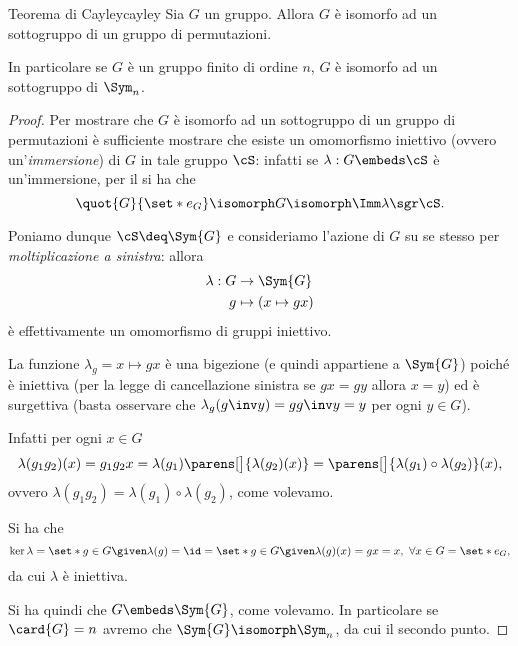 \begin{theorem}
    {Teorema di Cayley}{cayley}
    Sia $G$ un gruppo. Allora $G$ è isomorfo ad un sottogruppo di un gruppo di permutazioni.

    In particolare se $G$ è un gruppo finito di ordine $n$, $G$ è isomorfo ad un sottogruppo di $\Sym_n$. 
\end{theorem}
\begin{proof}
    Per mostrare che $G$ è isomorfo ad un sottogruppo di un gruppo di permutazioni è sufficiente mostrare che esiste un omomorfismo iniettivo (ovvero un'\emph{immersione}) di $G$ in tale gruppo $\cS$: infatti se $\lambda : G \embeds \cS$ è un'immersione, per il  si ha che \[
        \quot{G}{\set*{e_G}} \isomorph G \isomorph \Imm \lambda \sgr \cS.
    \]

    Poniamo dunque $\cS \deq \Sym{G}$ e consideriamo l'azione di $G$ su se stesso per \emph{moltiplicazione a sinistra}: allora \begin{align*}
        \lambda : G &\to \Sym{G}\\
        g &\mapsto (x \mapsto gx)
    \end{align*} è effettivamente un omomorfismo di gruppi iniettivo.

     La funzione $\lambda_g = x \mapsto gx$ è una bigezione (e quindi appartiene a $\Sym{G}$) poiché è iniettiva (per la legge di cancellazione sinistra se $gx = gy$ allora $x = y$) ed è surgettiva (basta osservare che $\lambda_g(g\inv y) = gg\inv y = y$ per ogni $y \in G$).

     Infatti per ogni $x \in G$ \[
        \lambda(g_1g_2)(x) = g_1g_2x = \lambda(g_1)\parens[\big]{\lambda(g_2)(x)} = \parens[\big]{\lambda(g_1) \circ \lambda(g_2)}(x),
    \] ovvero $\lambda(g_1g_2) = \lambda(g_1) \circ \lambda(g_2)$, come volevamo.

     Si ha che \[
        \ker \lambda = \set*{g \in G \given \lambda(g) = \id} = \set*{g \in G \given \lambda(g)(x) = gx = x,\ \forall x \in G} = \set*{e_G},
    \] da cui $\lambda$ è iniettiva.

    Si ha quindi che $G \embeds \Sym{G}$, come volevamo. In particolare se $\card{G} = n$ avremo che $\Sym{G} \isomorph \Sym_n$, da cui il secondo punto.
\end{proof}